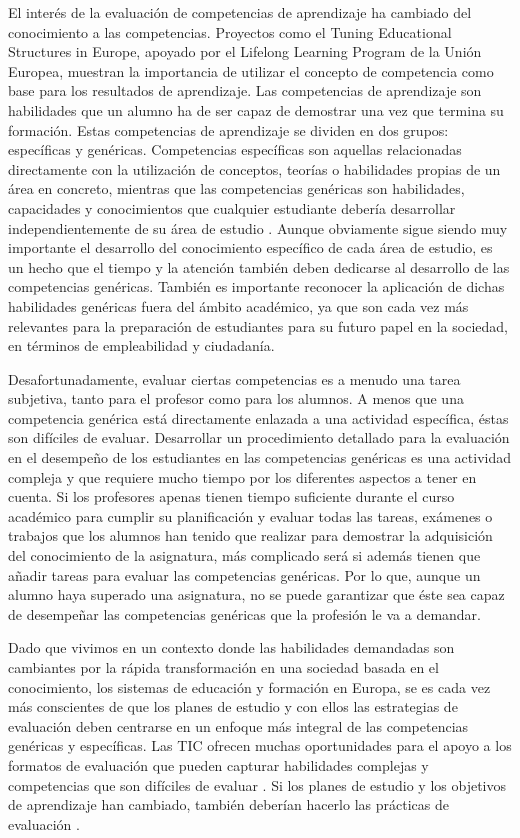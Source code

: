 
El interés de la evaluación de competencias de aprendizaje ha cambiado del conocimiento a las competencias. Proyectos como el Tuning Educational Structures in Europe, apoyado por el Lifelong Learning Program de la Unión Europea, muestran la importancia de utilizar el concepto de competencia como base para los resultados de aprendizaje. Las competencias de aprendizaje son habilidades que un alumno ha de ser capaz de demostrar una vez que termina su formación. Estas competencias de aprendizaje se dividen en dos grupos: específicas y genéricas. Competencias específicas son aquellas relacionadas directamente con la utilización de conceptos, teorías o habilidades propias de un área en concreto, mientras que las competencias genéricas son habilidades, capacidades y conocimientos que cualquier estudiante debería desarrollar independientemente de su área de estudio \cite{Tuning:2003}. Aunque obviamente sigue siendo muy importante el desarrollo del conocimiento específico de cada área de estudio, es un hecho que el tiempo y la atención también deben dedicarse al desarrollo de las competencias genéricas. También es importante reconocer la aplicación de dichas habilidades genéricas fuera del ámbito académico, ya que son cada vez más relevantes para la preparación de estudiantes para su futuro papel en la sociedad, en términos de empleabilidad y ciudadanía.

Desafortunadamente, evaluar ciertas competencias es a menudo una tarea subjetiva, tanto para el profesor como para los alumnos. A menos que una competencia genérica está directamente enlazada a una actividad específica, éstas son difíciles de evaluar. Desarrollar un procedimiento detallado para la evaluación en el desempeño de los estudiantes en las competencias genéricas es una actividad compleja y que requiere mucho tiempo por los diferentes aspectos a tener en cuenta. Si los profesores apenas tienen tiempo suficiente durante el curso académico para cumplir su planificación y evaluar todas las tareas, exámenes o trabajos que los alumnos han tenido que realizar para demostrar la adquisición del conocimiento de la asignatura, más complicado será si además tienen que añadir tareas para evaluar las competencias genéricas. Por lo que, aunque un alumno haya superado una asignatura, no se puede garantizar que éste sea capaz de desempeñar las competencias genéricas que la profesión le va a demandar.

Dado que vivimos en un contexto donde las habilidades demandadas son cambiantes por la rápida transformación en una sociedad basada en el conocimiento, los sistemas de educación y formación en Europa, se es cada vez más conscientes de que los planes de estudio y con ellos las estrategias de evaluación deben centrarse en un enfoque más integral de las competencias genéricas y específicas. Las TIC ofrecen muchas oportunidades para el apoyo a los formatos de evaluación que pueden capturar habilidades complejas y competencias que son difíciles de evaluar \cite{Redecker:2013}. Si los planes de estudio y los objetivos de aprendizaje han cambiado, también deberían hacerlo las prácticas de evaluación \cite{Cachia:2011}.

